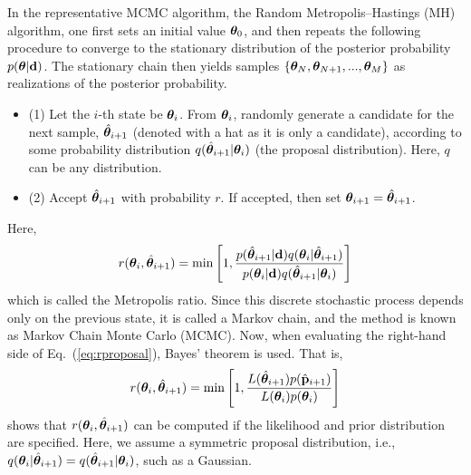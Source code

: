 In the representative MCMC algorithm, the Random Metropolis–Hastings (MH) algorithm, one first sets an initial value ${\boldsymbol{\theta}}_0$, and then repeats the following procedure to converge to the stationary distribution of the posterior probability $p({\boldsymbol{\theta}}|{\bf d})$. The stationary chain then yields samples $\{{\boldsymbol{\theta}}_N,{\boldsymbol{\theta}}_{N+1},..., {\boldsymbol{\theta}}_{M}\}$ as realizations of the posterior probability.
\begin{itemize}
 \item (1) Let the $i$-th state be ${\boldsymbol{\theta}}_i$. From ${\boldsymbol{\theta}}_i$, randomly generate a candidate for the next sample, $\hat{\boldsymbol{\theta}}_{i+1}$ (denoted with a hat as it is only a candidate), according to some probability distribution $q(\hat{\boldsymbol{\theta}}_{i+1}|{\boldsymbol{\theta}}_i)$ (the proposal distribution). Here, $q$ can be any distribution.
 \item (2) Accept $\hat{\boldsymbol{\theta}}_{i+1}$ with probability $r$. If accepted, then set ${\boldsymbol{\theta}}_{i+1}=\hat{\boldsymbol{\theta}}_{i+1}$.
\end{itemize}

Here,
\begin{align}
  \label{eq:rproposal}
r({\boldsymbol{\theta}}_i,\hat{\boldsymbol{\theta}}_{i+1}) = \mathrm{min} \left[1, \frac{p(\hat{\boldsymbol{\theta}}_{i+1}|{\bf d}) q({\boldsymbol{\theta}}_i|\hat{\boldsymbol{\theta}}_{i+1})}{p({\boldsymbol{\theta}}_i|{\bf d}) q(\hat{\boldsymbol{\theta}}_{i+1}|{\boldsymbol{\theta}}_i)} \right]
\end{align}
which is called the Metropolis ratio. Since this discrete stochastic process depends only on the previous state, it is called a Markov chain, and the method is known as Markov Chain Monte Carlo (MCMC). Now, when evaluating the right-hand side of Eq.~(\ref{eq:rproposal}), Bayes' theorem is used. That is,
\begin{align}
  \label{eq:rpbayes}
r({\boldsymbol{\theta}}_i,\hat{\boldsymbol{\theta}}_{i+1})  = \mathrm{min} \left[1, \frac{L(\hat{\boldsymbol{\theta}}_{i+1}) p(\hat{\bf p }_{i+1})}{L({\boldsymbol{\theta}}_{i}) p({\boldsymbol{\theta}}_{i})} \right]
\end{align}
shows that $r({\boldsymbol{\theta}}_i,\hat{\boldsymbol{\theta}}_{i+1})$ can be computed if the likelihood and prior distribution are specified. Here, we assume a symmetric proposal distribution, i.e., $q({\boldsymbol{\theta}}_i|\hat{\boldsymbol{\theta}}_{i+1})= q(\hat{\boldsymbol{\theta}}_{i+1}|{\boldsymbol{\theta}}_i)$, such as a Gaussian.


